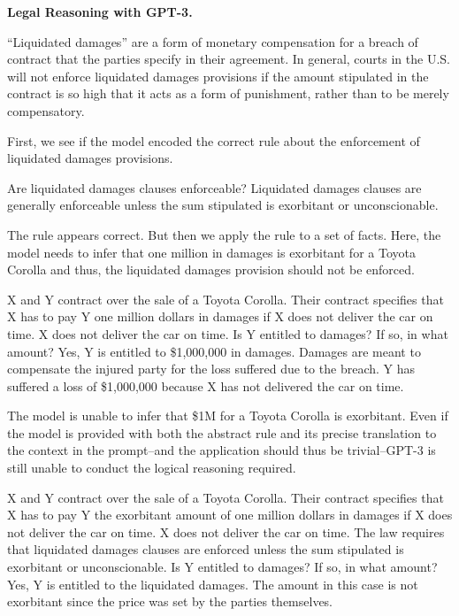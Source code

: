\begin{tcolorbox}
\begin{center}
\textbf{Legal Reasoning with GPT-3.} 
\end{center}

``Liquidated damages'' are a form of monetary compensation for a breach of contract that the parties specify in their agreement. In general, courts in the U.S. will not enforce liquidated damages provisions if the amount stipulated in the contract is so high that it acts as a form of punishment, rather than to be merely compensatory.

First, we see if the model encoded the correct rule about the enforcement of liquidated damages provisions.

\begin{dialogue}
 Are liquidated damages clauses enforceable?
 Liquidated damages clauses are generally enforceable unless the sum stipulated is exorbitant or unconscionable.
\end{dialogue}

The rule appears correct. But then we apply the rule to a set of facts. Here, the model needs to infer that one million in damages is exorbitant for a Toyota Corolla and thus, the liquidated damages provision should not be enforced.

\begin{dialogue}
 X and Y contract over the sale of a Toyota Corolla. Their contract specifies that X has to pay Y one million dollars in damages if X does not deliver the car on time. X does not deliver the car on time. Is Y entitled to damages? If so, in what amount?
 Yes, Y is entitled to \$1,000,000 in damages. Damages are meant to compensate the injured party for the loss suffered due to the breach. Y has suffered a loss of \$1,000,000 because X has not delivered the car on time.
\end{dialogue}

The model is unable to infer that \$1M for a Toyota Corolla is exorbitant. Even if the model is provided with both the abstract rule and its precise translation to the context in the prompt--and the application should thus be trivial--GPT-3 is still unable to conduct the logical reasoning required.

\begin{dialogue}
 X and Y contract over the sale of a Toyota Corolla. Their contract specifies that X has to pay Y the exorbitant amount of one million dollars in damages if X does not deliver the car on time. X does not deliver the car on time. The law requires that liquidated damages clauses are enforced unless the sum stipulated is exorbitant or unconscionable. Is Y entitled to damages? If so, in what amount?
 Yes, Y is entitled to the liquidated damages. The amount in this case is not exorbitant since the price was set by the parties themselves.
\end{dialogue}
\end{tcolorbox}

